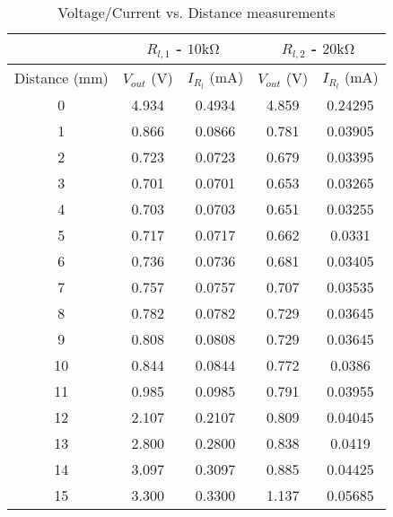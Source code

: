 \documentclass[CMPE]{KGCOEReport}
\begin{document}
\begin{longtable}[c]{|c|c|c|c|c|}
\caption{Voltage/Current vs. Distance measurements}
\label{tbl:circuit1}
\hline
		& \multicolumn{2}{c|}{$R_{l,1}$ - $10\si{\kilo\ohm}$} & \multicolumn{2}{c|}{$R_{l,2}$ - $20\si{\kilo\ohm}$} \\ \hline
\endfirsthead
%
\endhead
%
		Distance ($\si{\milli\meter}$) & $V_{out}$ ($\si\volt$)       & $I_{R_l}$ ($\si{\milli\ampere}$)      & $V_{out}$ ($\si\volt$)       & $I_{R_l}$ ($\si{\milli\ampere}$)      \\ \hline
0             & 4.934          & 0.4934        & 4.859          & 0.24295       \\ \hline
1             & 0.866          & 0.0866        & 0.781          & 0.03905       \\ \hline
2             & 0.723          & 0.0723        & 0.679          & 0.03395       \\ \hline
3             & 0.701          & 0.0701        & 0.653          & 0.03265       \\ \hline
4             & 0.703          & 0.0703        & 0.651          & 0.03255       \\ \hline
5             & 0.717          & 0.0717        & 0.662          & 0.0331        \\ \hline
6             & 0.736          & 0.0736        & 0.681          & 0.03405       \\ \hline
7             & 0.757          & 0.0757        & 0.707          & 0.03535       \\ \hline
8             & 0.782          & 0.0782        & 0.729          & 0.03645       \\ \hline
9             & 0.808          & 0.0808        & 0.729          & 0.03645       \\ \hline
10            & 0.844          & 0.0844        & 0.772          & 0.0386        \\ \hline
11            & 0.985          & 0.0985        & 0.791          & 0.03955       \\ \hline
12            & 2.107          & 0.2107        & 0.809          & 0.04045       \\ \hline
13            & 2.800          & 0.2800        & 0.838          & 0.0419        \\ \hline
14            & 3.097          & 0.3097        & 0.885          & 0.04425       \\ \hline
15            & 3.300          & 0.3300        & 1.137          & 0.05685       \\ \hline

\end{longtable}
\end{document}
